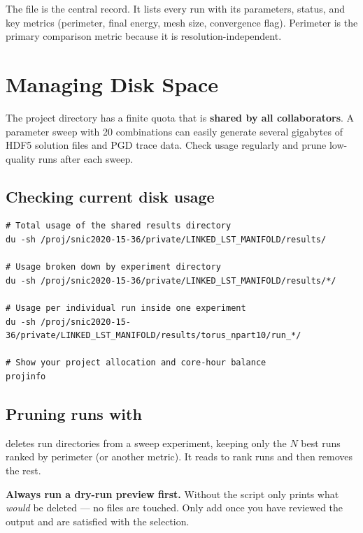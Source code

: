 \documentclass[11pt,a4paper]{article}
\begin{document}
The  file is the central record.  It lists
every run with its parameters, status, and key metrics (perimeter,
final energy, mesh size, convergence flag).  Perimeter is the primary
comparison metric because it is resolution-independent.

\section{Managing Disk Space}
\label{sec:diskspace}

The project directory  has a finite
quota that is \textbf{shared by all collaborators}.  A parameter sweep with
20 combinations can easily generate several gigabytes of HDF5 solution files
and PGD trace data.  Check usage regularly and prune low-quality runs after
each sweep.

\subsection{Checking current disk usage}

\begin{lstlisting}[style=shell]
# Total usage of the shared results directory
du -sh /proj/snic2020-15-36/private/LINKED_LST_MANIFOLD/results/

# Usage broken down by experiment directory
du -sh /proj/snic2020-15-36/private/LINKED_LST_MANIFOLD/results/*/

# Usage per individual run inside one experiment
du -sh /proj/snic2020-15-36/private/LINKED_LST_MANIFOLD/results/torus_npart10/run_*/

# Show your project allocation and core-hour balance
projinfo
\end{lstlisting}

\subsection{Pruning runs with }

 deletes run directories from a
sweep experiment, keeping only the $N$ best runs ranked by perimeter (or
another metric).  It reads  to rank runs and
then removes the rest.

\begin{warnbox}
\textbf{Always run a dry-run preview first.}
Without  the script only prints what \emph{would} be
deleted --- no files are touched.  Only add  once you
have reviewed the output and are satisfied with the selection.
\end{warnbox}
\end{document}
